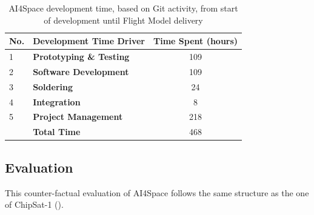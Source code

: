 \documentclass[a4paper,nobib,justified,final]{tufte-book}
\begin{document}
\begin{table}[h]
	\caption[AI4Space development time]{AI4Space development time, based on Git activity, from start of development until Flight Model delivery}
	\label{tab:c_ai4space_times}
	\begin{tabular}{@{}llS@{}}
		\toprule
		No. & \textbf{Development Time Driver} & {Time Spent (hours)} \\ \midrule
		1   & \textbf{Prototyping \& Testing}  & 109                \\
		2   & \textbf{Software Development}    & 109                \\
		3   & \textbf{Soldering}               & 24                 \\
		4   & \textbf{Integration}             & 8                 \\
		5   & \textbf{Project Management}      & 218                 \\ \midrule
		& \textbf{Total Time}                  & 468                \\ \bottomrule
	\end{tabular}
\end{table}

\subsection{Evaluation}
\label{sec:CASESTUDIES_ai4space_evaluation}

This counter-factual evaluation of AI4Space follows the same structure as the one of ChipSat-1 ().
\end{document}
